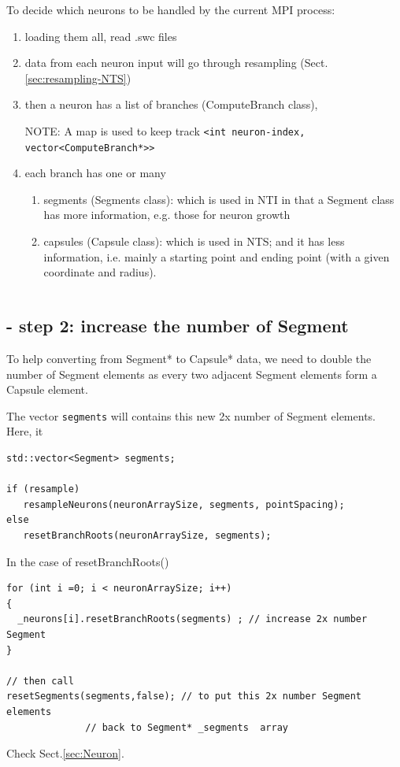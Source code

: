 To decide which neurons to be handled by the current MPI process:
\begin{enumerate}
  \item  loading them all, read .swc files  

  \item data from each neuron input will go through resampling
  (Sect.\ref{sec:resampling-NTS})
  
  \item then a neuron has a list of branches (ComputeBranch class), 
  
NOTE: A map is used to keep track
\verb!<int neuron-index, vector<ComputeBranch*>>!
  
  \item each branch has one or many 
  \begin{enumerate}
    \item segments (Segments class): which is used in NTI in that a Segment
    class has more information, e.g. those for neuron growth
    
    \item capsules (Capsule class): which is used in NTS; and it has less
    information, i.e. mainly a starting point and ending point (with a given
    coordinate and radius).
 \end{enumerate}  
\begin{verbatim}

\end{verbatim}  
  
\end{enumerate}


\subsection{- step 2: increase the number of Segment}

To help converting from Segment* to Capsule* data, we need to double the
number of Segment elements as every two adjacent Segment elements form 
a Capsule element.

The vector \verb!segments! will contains this new 2x number of Segment elements.
Here, it 
\begin{verbatim}
std::vector<Segment> segments; 

if (resample)
   resampleNeurons(neuronArraySize, segments, pointSpacing);
else
   resetBranchRoots(neuronArraySize, segments);
\end{verbatim}

In the case of resetBranchRoots()
\begin{verbatim}
for (int i =0; i < neuronArraySize; i++)
{ 
  _neurons[i].resetBranchRoots(segments) ; // increase 2x number Segment
}

// then call
resetSegments(segments,false); // to put this 2x number Segment elements
              // back to Segment* _segments  array
\end{verbatim}
Check Sect.\ref{sec:Neuron}.
 
